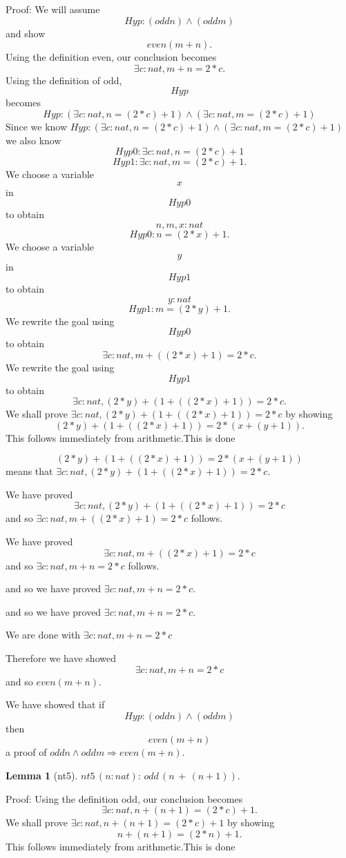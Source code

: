 \documentclass[11pt, oneside]{article}
\newtheorem{Lemma}{Lemma}
\begin{document}
 Proof: We will assume $$Hyp : (odd n) \land (odd m) $$ and show $$even (m + n) .$$Using the definition even, our conclusion becomes $$\exists c : nat, m + n = 2 * c .$$Using the definition of odd, $$Hyp $$ becomes $$Hyp : (\exists c : nat, n = (2 * c) + 1) \land (\exists c : nat, m = (2 * c) + 1) $$ Since we know $Hyp : (\exists c : nat, n = (2 * c) + 1) \land (\exists c : nat, m = (2 * c) + 1) $ we also know $$Hyp0 : \exists c : nat, n = (2 * c) + 1 $$ $$Hyp1 : \exists c : nat, m = (2 * c) + 1 .$$We choose a variable $$x$$ in $$Hyp0 $$ to obtain $$n, m, x : nat $$ $$Hyp0 : n = (2 * x) + 1 .$$ We choose a variable $$y$$ in $$Hyp1 $$ to obtain $$y : nat $$ $$Hyp1 : m = (2 * y) + 1 .$$ We rewrite the goal using $$Hyp0 $$ to obtain $$\exists c : nat, m + ((2 * x) + 1) = 2 * c .$$We rewrite the goal using $$Hyp1 $$ to obtain $$\exists c : nat, (2 * y) + (1 + ((2 * x) + 1)) = 2 * c .$$We shall prove $\exists c : nat, (2 * y) + (1 + ((2 * x) + 1)) = 2 * c $ by showing $$(2 * y) + (1 + ((2 * x) + 1)) = 2 * (x + (y + 1)) .$$This follows immediately from arithmetic.This is done

 $$(2 * y) + (1 + ((2 * x) + 1)) = 2 * (x + (y + 1)) $$ means that $\exists c : nat, (2 * y) + (1 + ((2 * x) + 1)) = 2 * c $.

 We have proved $$\exists c : nat, (2 * y) + (1 + ((2 * x) + 1)) = 2 * c $$ and so $\exists c : nat, m + ((2 * x) + 1) = 2 * c $ follows.

 We have proved $$\exists c : nat, m + ((2 * x) + 1) = 2 * c $$ and so $\exists c : nat, m + n = 2 * c $ follows.

 and so we have proved $\exists c : nat, m + n = 2 * c $.

 and so we have proved $\exists c : nat, m + n = 2 * c $.

 We are done with $\exists c : nat, m + n = 2 * c $

 Therefore we have showed $$\exists c : nat, m + n = 2 * c $$ and so $even (m + n) $.

 We have showed that if $$Hyp : (odd n) \land (odd m) $$ then $$even (m + n) $$ a proof of $odd n \land odd m \Rightarrow even (m + n) $.\begin{Lemma}[nt5] \label{Lemma:nt5}
$nt5\,(n:nat):\,odd\,(n\,+\,(n+1)).$
 \end{Lemma}


 Proof: Using the definition odd, our conclusion becomes $$\exists c : nat, n + (n + 1) = (2 * c) + 1 .$$We shall prove $\exists c : nat, n + (n + 1) = (2 * c) + 1 $ by showing $$n + (n + 1) = (2 * n) + 1 .$$This follows immediately from arithmetic.This is done
\end{document}
